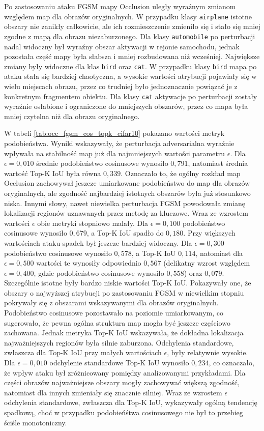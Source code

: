 \noindent Po zastosowaniu ataku FGSM mapy Occlusion uległy wyraźnym zmianom względem map dla obrazów oryginalnych. W przypadku klasy \texttt{airplane} istotne obszary nie zanikły całkowicie, ale ich rozmieszczenie zmieniło się i stało się mniej zgodne z mapą dla obrazu niezaburzonego. Dla klasy \texttt{automobile} po perturbacji nadal widoczny był wyraźny obszar aktywacji w rejonie samochodu, jednak pozostała część mapy była słabsza i mniej rozbudowana niż wcześniej.
Największe zmiany były widoczne dla klas \texttt{bird} oraz \texttt{cat}. W przypadku klasy \texttt{bird} mapa po ataku stała się bardziej chaotyczna, a wysokie wartości atrybucji pojawiały się w wielu miejscach obrazu, przez co trudniej było jednoznacznie powiązać je z konkretnym fragmentem obiektu. Dla klasy \texttt{cat} aktywacje po perturbacji zostały wyraźnie osłabione i ograniczone do mniejszych obszarów, przez co mapa była mniej czytelna niż dla obrazu oryginalnego.

W tabeli \ref{tab:occ_fgsm_cos_topk_cifar10} pokazano wartości metryk podobieństwa. Wyniki wskazywały, że perturbacja adversarialna wyraźnie wpływała na stabilność map już dla najmniejszych wartości parametru $\epsilon$.
Dla $\epsilon = 0{,}010$ średnie podobieństwo cosinusowe wynosiło $0{,}791$, natomiast średnia wartość Top-K IoU była równa $0{,}339$. Oznaczało to, że ogólny rozkład map Occlusion zachowywał jeszcze umiarkowane podobieństwo do map dla obrazów oryginalnych, ale zgodność najbardziej istotnych obszarów była już stosunkowo niska. Innymi słowy, nawet niewielka perturbacja FGSM powodowała zmianę lokalizacji regionów uznawanych przez metodę za kluczowe.
Wraz ze wzrostem wartości $\epsilon$ obie metryki stopniowo malały. Dla $\epsilon = 0{,}100$ podobieństwo cosinusowe wynosiło $0{,}679$, a Top-K IoU spadło do $0{,}180$. Przy większych wartościach ataku spadek był jeszcze bardziej widoczny. Dla $\epsilon = 0{,}300$ podobieństwo cosinusowe wynosiło $0{,}578$, a Top-K IoU $0{,}114$, natomiast dla $\epsilon = 0{,}500$ wartości te wynosiły odpowiednio $0{,}567$ (delikatny wzrost względem $\epsilon = 0{,}400$, gdzie podobieństwo cosinusowe wynosiło $0{,}558$) oraz $0{,}079$.
Szczególnie istotne były bardzo niskie wartości Top-K IoU. Pokazywały one, że obszary o najwyższej atrybucji po zastosowaniu FGSM w niewielkim stopniu pokrywały się z obszarami wskazywanymi dla obrazów oryginalnych. Podobieństwo cosinusowe pozostawało na poziomie umiarkowanym, co sugerowało, że pewna ogólna struktura map mogła być jeszcze częściowo zachowana. Jednak metryka Top-K IoU wskazywała, że dokładna lokalizacja najważniejszych regionów była silnie zaburzona.
Odchylenia standardowe, zwłaszcza dla Top-K IoU przy małych wartościach $\epsilon$, były relatywnie wysokie. Dla $\epsilon = 0{,}010$ odchylenie standardowe Top-K IoU wynosiło $0{,}234$, co oznaczało, że wpływ ataku był zróżnicowany pomiędzy analizowanymi przykładami. Dla części obrazów najważniejsze obszary mogły zachowywać większą zgodność, natomiast dla innych zmieniały się znacznie silniej. Wraz ze wzrostem $\epsilon$ odchylenia standardowe, zwłaszcza dla Top-K IoU, wykazywały ogólną tendencję spadkową, choć w przypadku podobieńśtwa cosinusowego nie był to przebieg ściśle monotoniczny.

